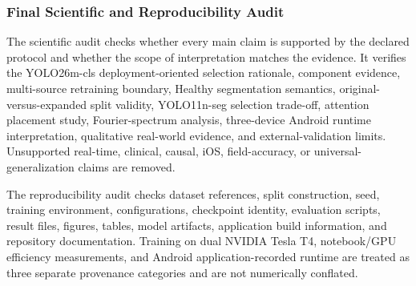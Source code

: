 \documentclass[12pt,a4paper]{report}
\newenvironment{revisionblock}{\begin{snugshade}\noindent}{\end{snugshade}}
\begin{document}
\subsubsection{\texorpdfstring{\colorbox{RevisionYellow}{Final Scientific and Reproducibility Audit}}{Final Scientific and Reproducibility Audit}}
\begin{revisionblock}
The scientific audit checks whether every main claim is supported by the declared protocol and whether the scope of interpretation matches the evidence. It verifies the YOLO26m-cls deployment-oriented selection rationale, component evidence, multi-source retraining boundary, Healthy segmentation semantics, original-versus-expanded split validity, YOLO11n-seg selection trade-off, attention placement study, Fourier-spectrum analysis, three-device Android runtime interpretation, qualitative real-world evidence, and external-validation limits. Unsupported real-time, clinical, causal, iOS, field-accuracy, or universal-generalization claims are removed.
\end{revisionblock}
\begin{revisionblock}
The reproducibility audit checks dataset references, split construction, seed, training environment, configurations, checkpoint identity, evaluation scripts, result files, figures, tables, model artifacts, application build information, and repository documentation. Training on dual NVIDIA Tesla T4, notebook/GPU efficiency measurements, and Android application-recorded runtime are treated as three separate provenance categories and are not numerically conflated.
\end{revisionblock}
\end{document}
